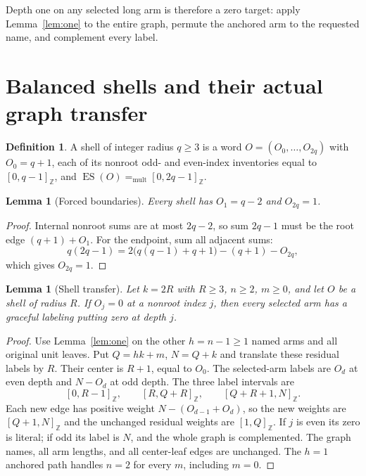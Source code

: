 \documentclass[11pt,a4paper]{article}
\newtheorem{lemma}[theorem]{Lemma}
\theoremstyle{definition}\newtheorem{definition}[theorem]{Definition}
\theoremstyle{remark}\newtheorem{remark}[theorem]{Remark}
\newcommand{\ints}[2]{[#1,#2]_{\mathbb Z}}
\newcommand{\ES}{\operatorname{ES}}
\newcommand{\mult}{\mathrel{=_{\mathrm{mult}}}}
\begin{document}
Depth one on any selected long arm is therefore a zero target: apply
Lemma~\ref{lem:one} to the entire graph, permute the anchored arm to
the requested name, and complement every label.

\section{Balanced shells and their actual graph transfer}
\label{sec:shell}
\begin{definition}
A shell of integer radius $q\ge3$ is a word $O=(O_0,\ldots,O_{2q})$ with
$O_0=q+1$, each of its nonroot odd- and even-index inventories equal to
$\ints0{q-1}$, and $\ES(O)\mult\ints0{2q-1}$.
\end{definition}
\begin{lemma}[Forced boundaries]\label{lem:forced}
Every shell has $O_1=q-2$ and $O_{2q}=1$.
\end{lemma}
\begin{proof}
Internal nonroot sums are at most $2q-2$, so sum $2q-1$ must be the
root edge $(q+1)+O_1$. For the endpoint, sum all adjacent sums:
\[
 q(2q-1)=2\bigl(q(q-1)+q+1\bigr)-(q+1)-O_{2q},
\]
which gives $O_{2q}=1$.
\end{proof}

\begin{lemma}[Shell transfer]\label{lem:transfer}
Let $k=2R$ with $R\ge3$, $n\ge2$, $m\ge0$, and let $O$ be a shell of radius $R$.
If $O_j=0$ at a nonroot index $j$, then every selected arm has a graceful
labeling putting zero at depth $j$.
\end{lemma}
\begin{proof}
Use Lemma~\ref{lem:one} on the other $h=n-1\ge1$ named arms and all
original unit leaves. Put $Q=hk+m$, $N=Q+k$ and translate these residual
labels by $R$. Their center is $R+1$, equal to $O_0$.
The selected-arm labels are $O_d$ at even depth and $N-O_d$ at odd depth.
The three label intervals are
\[
 \ints0{R-1},\qquad\ints R{Q+R},\qquad\ints{Q+R+1}N.
\]
Each new edge has positive weight $N-(O_{d-1}+O_d)$, so the new weights
are $\ints{Q+1}N$ and the unchanged residual weights are $\ints1Q$.
If $j$ is even its zero is literal; if odd its label is $N$, and the
whole graph is complemented. The graph names, all arm lengths, and all
center-leaf edges are unchanged. The $h=1$ anchored path handles
$n=2$ for every $m$, including $m=0$.
\end{proof}

\end{document}
